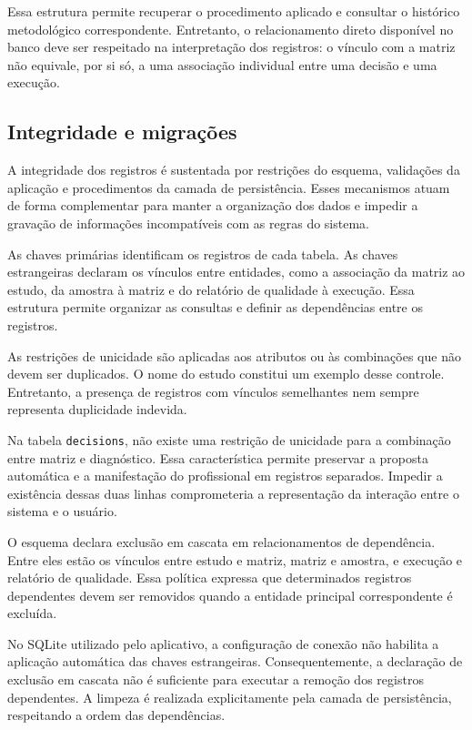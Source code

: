 Essa estrutura permite recuperar o procedimento aplicado e consultar o histórico metodológico correspondente. Entretanto, o relacionamento direto disponível no banco deve ser respeitado na interpretação dos registros: o vínculo com a matriz não equivale, por si só, a uma associação individual entre uma decisão e uma execução.

\subsection{Integridade e migrações}
\label{subsec:integridade-migracoes}

A integridade dos registros é sustentada por restrições do esquema, validações da aplicação e procedimentos da camada de persistência. Esses mecanismos atuam de forma complementar para manter a organização dos dados e impedir a gravação de informações incompatíveis com as regras do sistema.

As chaves primárias identificam os registros de cada tabela. As chaves estrangeiras declaram os vínculos entre entidades, como a associação da matriz ao estudo, da amostra à matriz e do relatório de qualidade à execução. Essa estrutura permite organizar as consultas e definir as dependências entre os registros.

As restrições de unicidade são aplicadas aos atributos ou às combinações que não devem ser duplicados. O nome do estudo constitui um exemplo desse controle. Entretanto, a presença de registros com vínculos semelhantes nem sempre representa duplicidade indevida.

Na tabela \texttt{decisions}, não existe uma restrição de unicidade para a combinação entre matriz e diagnóstico. Essa característica permite preservar a proposta automática e a manifestação do profissional em registros separados. Impedir a existência dessas duas linhas comprometeria a representação da interação entre o sistema e o usuário.

O esquema declara exclusão em cascata em relacionamentos de dependência. Entre eles estão os vínculos entre estudo e matriz, matriz e amostra, e execução e relatório de qualidade. Essa política expressa que determinados registros dependentes devem ser removidos quando a entidade principal correspondente é excluída.

No SQLite utilizado pelo aplicativo, a configuração de conexão não habilita a aplicação automática das chaves estrangeiras. Consequentemente, a declaração de exclusão em cascata não é suficiente para executar a remoção dos registros dependentes. A limpeza é realizada explicitamente pela camada de persistência, respeitando a ordem das dependências.

